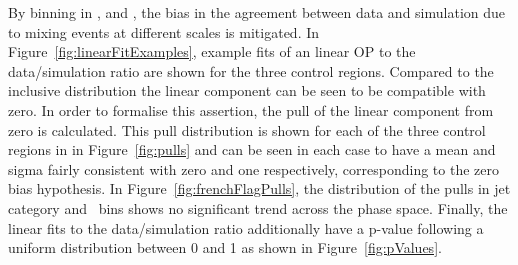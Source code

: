 By binning in \scalht, \njet and \nb, the bias in the agreement 
between data and simulation due to mixing events at different scales is mitigated. 
In Figure~\ref{fig:linearFitExamples}, example fits of an linear OP to the data/simulation ratio 
are shown for the three control regions. Compared to the inclusive distribution
the linear component can be seen to be compatible with zero. In order to formalise this assertion,
the pull of the linear component from zero is calculated.
This pull distribution is shown for each of the three control regions in
in Figure~\ref{fig:pulls} and can be seen in each case to have a mean and sigma fairly 
consistent with zero and one respectively, corresponding to the zero bias hypothesis.
In Figure~\ref{fig:frenchFlagPulls}, the distribution of the pulls 
in jet category and \scalht~bins shows no significant trend across the phase space.
Finally, the linear fits to the data/simulation ratio additionally have a p-value following 
a uniform distribution between 0 and 1 as shown in Figure~\ref{fig:pValues}.

